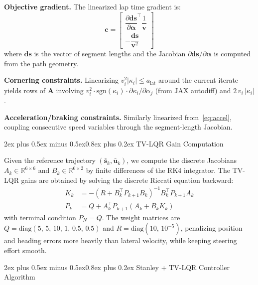 \documentclass[conf]{new-aiaa}
\makeatletter
\renewcommand\section{\@startsection{section}{1}{\z@}%
  {2ex plus 0.5ex minus 0.5ex}{0.8ex plus 0.2ex}%
  {\normalfont\large\bfseries\centering}}
\makeatother
\begin{document}
\textbf{Objective gradient.} The linearized lap time gradient is:
\begin{equation}
  \mathbf{c} = \begin{bmatrix}
    \dfrac{\partial \mathbf{ds}}{\partial \boldsymbol{\alpha}}^\top \dfrac{1}{\mathbf{v}} \\[6pt]
    -\dfrac{\mathbf{ds}}{\mathbf{v}^2}
  \end{bmatrix}
\end{equation}
where $\mathbf{ds}$ is the vector of segment lengths and the Jacobian
$\partial \mathbf{ds}/\partial\boldsymbol{\alpha}$ is computed from the path geometry.

\textbf{Cornering constraints.} Linearizing $v_i^2|\kappa_i| \leq a_{\text{lat}}$ around the
current iterate yields rows of $\mathbf{A}$ involving
$v_i^2 \cdot \text{sgn}(\kappa_i) \cdot \partial\kappa_i/\partial\alpha_j$ (from JAX autodiff)
and $2\,v_i\,|\kappa_i|$.

\textbf{Acceleration/braking constraints.} Similarly linearized from~\eqref{eq:accel}, coupling
consecutive speed variables through the segment-length Jacobian.

\section{TV-LQR Gain Computation}\label{app:tvlqr}

Given the reference trajectory $(\bar{\mathbf{s}}_k, \bar{\mathbf{u}}_k)$, we compute the
discrete Jacobians $A_k \in \mathbb{R}^{6\times 6}$ and $B_k \in \mathbb{R}^{6\times 2}$ by
finite differences of the RK4 integrator. The TV-LQR gains are obtained by solving the discrete
Riccati equation backward:
\begin{align}
  K_k &= -(R + B_k^\top P_{k+1} B_k)^{-1} B_k^\top P_{k+1} A_k \label{eq:Kgain}\\
  P_k &= Q + A_k^\top P_{k+1} (A_k + B_k K_k) \label{eq:riccati}
\end{align}
with terminal condition $P_N = Q$. The weight matrices are
$Q = \text{diag}(5,\, 5,\, 10,\, 1,\, 0.5,\, 0.5)$ and $R = \text{diag}(10,\, 10^{-5})$,
penalizing position and heading errors more heavily than lateral velocity, while keeping steering
effort smooth.

\section{Stanley + TV-LQR Controller Algorithm}\label{app:controller_algo}
\end{document}
